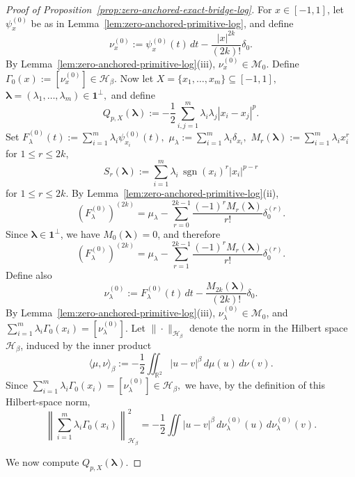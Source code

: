 \documentclass[10pt,a4paper]{amsart}
\begin{document}
\begin{proof}[Proof of Proposition~\ref{prop:zero-anchored-exact-bridge-log}]
For $x\in[-1,1]$, let $\psi_x^{(0)}$ be as in
Lemma~\ref{lem:zero-anchored-primitive-log}, and define
\[
\nu_x^{(0)}:=\psi_x^{(0)}(t)\,dt-\frac{|x|^{2k}}{(2k)!}\delta_0.
\]
By Lemma~\ref{lem:zero-anchored-primitive-log}\textnormal{(iii)}, $\nu_x^{(0)}\in \mathcal M_0$.
Define
\(
\Gamma_0(x):=[\nu_x^{(0)}]\in \mathcal H_\beta.
\)
Now let
\(
X=\{x_1,\dots,x_m\}\subseteq [-1,1],
\)
\(
\boldsymbol\lambda=(\lambda_1,\dots,\lambda_m)\in \boldsymbol{1}^{\perp},
\)
and define
\[
Q_{p,X}(\boldsymbol\lambda):=
-\frac12\sum_{i,j=1}^m \lambda_i\lambda_j|x_i-x_j|^p.
\]
Set
\(
F_\lambda^{(0)}(t):=\sum_{i=1}^m \lambda_i\psi_{x_i}^{(0)}(t),\)
\(
\mu_\lambda:=\sum_{i=1}^m \lambda_i\delta_{x_i},
\)
\(
M_r(\boldsymbol\lambda):=\sum_{i=1}^m \lambda_i x_i^r
\)
for \(1\le r\le 2k\),
\[
S_r(\boldsymbol\lambda):=\sum_{i=1}^m \lambda_i\,\operatorname{sgn}(x_i)^r|x_i|^{p-r}
\]
for \(1\le r\le 2k.\)
By Lemma~\ref{lem:zero-anchored-primitive-log}\textnormal{(ii)},
\[
(F_\lambda^{(0)})^{(2k)}
=
\mu_\lambda-\sum_{r=0}^{2k-1}\frac{(-1)^r M_r(\boldsymbol\lambda)}{r!}\delta_0^{(r)}.
\]
Since $\boldsymbol\lambda\in\boldsymbol{1}^{\perp}$, we have $M_0(\boldsymbol\lambda)=0$, and therefore
\begin{equation}\label{eq:primitive-distribution-log}
(F_\lambda^{(0)})^{(2k)}
=
\mu_\lambda-\sum_{r=1}^{2k-1}\frac{(-1)^r M_r(\boldsymbol\lambda)}{r!}\delta_0^{(r)}.
\end{equation}
Define also
\[
\nu_\lambda^{(0)}:=F_\lambda^{(0)}(t)\,dt-\frac{M_{2k}(\boldsymbol\lambda)}{(2k)!}\delta_0.
\]
By Lemma~\ref{lem:zero-anchored-primitive-log}\textnormal{(iii)}, $\nu_\lambda^{(0)}\in\mathcal M_0$, and
\(
\sum_{i=1}^m \lambda_i\Gamma_0(x_i)=[\nu_\lambda^{(0)}].
\)
Let \(\|\cdot\|_{\mathcal H_\beta}\) denote the norm in the Hilbert
space \(\mathcal H_\beta\), induced by the inner product
\[
\langle \mu,\nu\rangle_\beta
:=
-\frac12\iint_{\mathbb R^2}|u-v|^\beta\,d\mu(u)\,d\nu(v).
\]
Since
\(
\sum_{i=1}^m\lambda_i\Gamma_0(x_i)=[\nu_\lambda^{(0)}]\in\mathcal H_\beta,
\)
we have, by the definition of this Hilbert-space norm,
\begin{equation}\label{eq:nu-energy-log}
\left\|\sum_{i=1}^m \lambda_i\Gamma_0(x_i)\right\|_{\mathcal H_\beta}^2
=
-\frac12\iint |u-v|^\beta\,d\nu_\lambda^{(0)}(u)\,d\nu_\lambda^{(0)}(v).
\end{equation}

We now compute $Q_{p,X}(\boldsymbol\lambda)$.


\end{proof}
\end{document}
